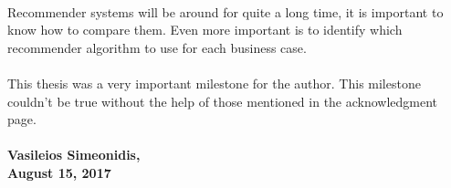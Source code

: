 \paragraph{} Recommender systems will be around for quite a long time, it is important to know how to compare them. Even more important is to identify which recommender algorithm to use for each business case.

\paragraph{} This thesis was a very important milestone for the author. This milestone couldn't be true without the help of those mentioned in the acknowledgment page.
\\
\paragraph{Vasileios Simeonidis, \\ August 15, 2017}